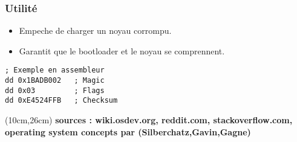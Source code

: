 \documentclass{article}
\begin{document}
\subsubsection*{Utilité}
\begin{itemize}
    \item Empeche de charger un noyau corrompu.
    \item Garantit que le bootloader et le noyau se comprennent.
\end{itemize}

\begin{verbatim}
; Exemple en assembleur
dd 0x1BADB002   ; Magic  
dd 0x03         ; Flags  
dd 0xE4524FFB   ; Checksum
\end{verbatim}




\begin{textblock*}{10cm}(10cm,26cm) %
    \textbf{sources : wiki.osdev.org, reddit.com, stackoverflow.com, operating system concepts par (Silberchatz,Gavin,Gagne)}
\end{textblock*}
\end{document}
